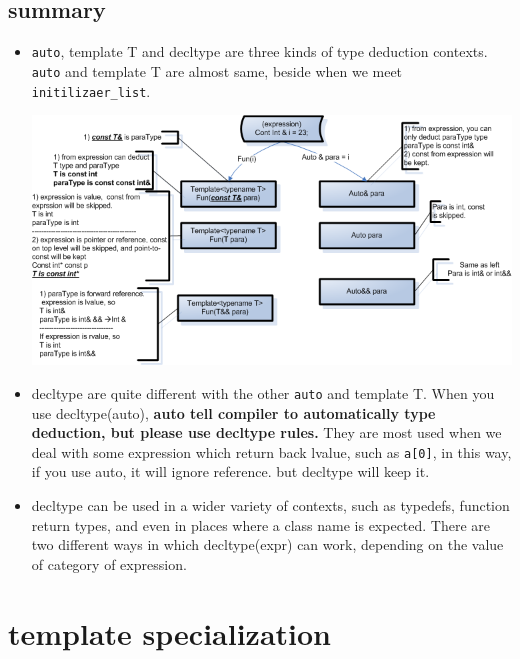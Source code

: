 \documentclass[a4paper,11pt,twoside]{book}
\begin{document}
\subsection{summary}
\begin{itemize}
	\item \texttt{auto}, template T and decltype are three kinds of type deduction contexts. \texttt{auto} and template T are almost same, beside when we meet \texttt{initilizaer\_list}.  

	\begin{center}
		\includegraphics[scale=0.6]{pics/type_deduct.png}
	\end{center}
	
	\item decltype are quite different with the other \texttt{auto} and template T. When you use decltype(auto), \textbf{auto tell compiler to automatically type deduction, but please use decltype rules.} They are most used when we deal with some expression which return back lvalue, such as \texttt{a[0]}, in this way, if you use auto, it will ignore reference. but decltype will keep it. 
	
	\item decltype can be used in a wider variety of contexts, such as typedefs, function return types, and even in places where a class name is expected. There are two different ways in which decltype(expr) can work, depending on the value of category of expression.
	

\end{itemize}

\section{template specialization}
\end{document}
